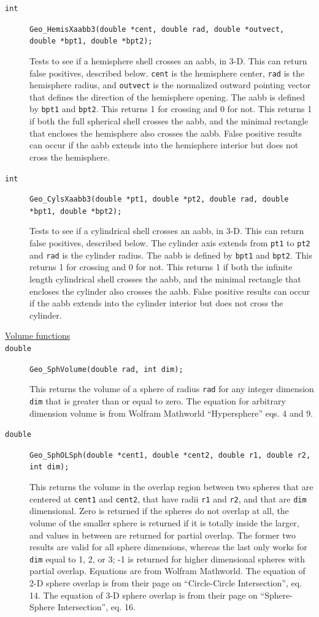 \documentclass[11pt]{article}
\newcommand {\ttt} {\texttt}
\begin{document}
\begin{description}
\item[\ttt{int}]
\ttt{Geo\_HemisXaabb3(double *cent, double rad, double *outvect, double *bpt1, double *bpt2);}

Tests to see if a hemisphere shell crosses an aabb, in 3-D. This can return false positives, described below. \ttt{cent} is the hemisphere center, \ttt{rad} is the hemisphere radius, and \ttt{outvect} is the normalized outward pointing vector that defines the direction of the hemisphere opening. The aabb is defined by \ttt{bpt1} and \ttt{bpt2}. This returns 1 for crossing and 0 for not. This returns 1 if both the full spherical shell crosses the aabb, and the minimal rectangle that encloses the hemisphere also crosses the aabb. False positive results can occur if the aabb extends into the hemisphere interior but does not cross the hemisphere.

\item[\ttt{int}]
\ttt{Geo\_CylsXaabb3(double *pt1, double *pt2, double rad, double *bpt1, double *bpt2);}

Tests to see if a cylindrical shell crosses an aabb, in 3-D. This can return false positives, described below. The cylinder axis extends from \ttt{pt1} to \ttt{pt2} and \ttt{rad} is the cylinder radius. The aabb is defined by \ttt{bpt1} and \ttt{bpt2}. This returns 1 for crossing and 0 for not. This returns 1 if both the infinite length cylindrical shell crosses the aabb, and the minimal rectangle that encloses the cylinder also crosses the aabb. False positive results can occur if the aabb extends into the cylinder interior but does not cross the cylinder.

\item[\underline{Volume functions}]

\item[\ttt{double}]
\ttt{Geo\_SphVolume(double rad, int dim);}

This returns the volume of a sphere of radius \ttt{rad} for any integer dimension \ttt{dim} that is greater than or equal to zero. The equation for arbitrary dimension volume is from Wolfram Mathworld ``Hypersphere'' eqs. 4 and 9.

\item[\ttt{double}]
\ttt{Geo\_SphOLSph(double *cent1, double *cent2, double r1, double r2, int dim);}

This returns the volume in the overlap region between two spheres that are centered at \ttt{cent1} and \ttt{cent2}, that have radii \ttt{r1} and \ttt{r2}, and that are \ttt{dim} dimensional. Zero is returned if the spheres do not overlap at all, the volume of the smaller sphere is returned if it is totally inside the larger, and values in between are returned for partial overlap. The former two results are valid for all sphere dimensions, whereas the last only works for \ttt{dim} equal to 1, 2, or 3; -1 is returned for higher dimensional spheres with partial overlap. Equations are from Wolfram Mathworld. The equation of 2-D sphere overlap is from their page on ``Circle-Circle Intersection'', eq. 14. The equation of 3-D sphere overlap is from their page on ``Sphere-Sphere Intersection'', eq. 16.


\end{description}



\end{document}
